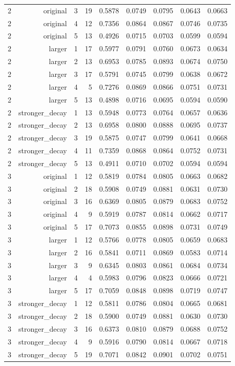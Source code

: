 \begin{longtable}{lrrrrrrrr}
2 & original & 3 & 19 & 0.5878 & 0.0749 & 0.0795 & 0.0643 & 0.0663 \\
2 & original & 4 & 12 & 0.7356 & 0.0864 & 0.0867 & 0.0746 & 0.0735 \\
2 & original & 5 & 13 & 0.4926 & 0.0715 & 0.0703 & 0.0599 & 0.0594 \\
2 & larger & 1 & 17 & 0.5977 & 0.0791 & 0.0760 & 0.0673 & 0.0634 \\
2 & larger & 2 & 13 & 0.6953 & 0.0785 & 0.0893 & 0.0674 & 0.0750 \\
2 & larger & 3 & 17 & 0.5791 & 0.0745 & 0.0799 & 0.0638 & 0.0672 \\
2 & larger & 4 & 5 & 0.7276 & 0.0869 & 0.0866 & 0.0751 & 0.0731 \\
2 & larger & 5 & 13 & 0.4898 & 0.0716 & 0.0695 & 0.0594 & 0.0590 \\
2 & stronger\_decay & 1 & 13 & 0.5948 & 0.0773 & 0.0764 & 0.0657 & 0.0636 \\
2 & stronger\_decay & 2 & 13 & 0.6958 & 0.0800 & 0.0888 & 0.0695 & 0.0737 \\
2 & stronger\_decay & 3 & 19 & 0.5875 & 0.0747 & 0.0799 & 0.0641 & 0.0668 \\
2 & stronger\_decay & 4 & 11 & 0.7359 & 0.0868 & 0.0864 & 0.0752 & 0.0731 \\
2 & stronger\_decay & 5 & 13 & 0.4911 & 0.0710 & 0.0702 & 0.0594 & 0.0594 \\
3 & original & 1 & 12 & 0.5819 & 0.0784 & 0.0805 & 0.0663 & 0.0682 \\
3 & original & 2 & 18 & 0.5908 & 0.0749 & 0.0881 & 0.0631 & 0.0730 \\
3 & original & 3 & 16 & 0.6369 & 0.0805 & 0.0879 & 0.0683 & 0.0752 \\
3 & original & 4 & 9 & 0.5919 & 0.0787 & 0.0814 & 0.0662 & 0.0717 \\
3 & original & 5 & 17 & 0.7073 & 0.0855 & 0.0898 & 0.0731 & 0.0749 \\
3 & larger & 1 & 12 & 0.5766 & 0.0778 & 0.0805 & 0.0659 & 0.0683 \\
3 & larger & 2 & 16 & 0.5841 & 0.0711 & 0.0869 & 0.0583 & 0.0714 \\
3 & larger & 3 & 9 & 0.6345 & 0.0803 & 0.0861 & 0.0684 & 0.0734 \\
3 & larger & 4 & 4 & 0.5983 & 0.0796 & 0.0823 & 0.0666 & 0.0721 \\
3 & larger & 5 & 17 & 0.7059 & 0.0848 & 0.0898 & 0.0719 & 0.0747 \\
3 & stronger\_decay & 1 & 12 & 0.5811 & 0.0786 & 0.0804 & 0.0665 & 0.0681 \\
3 & stronger\_decay & 2 & 18 & 0.5900 & 0.0749 & 0.0881 & 0.0630 & 0.0730 \\
3 & stronger\_decay & 3 & 16 & 0.6373 & 0.0810 & 0.0879 & 0.0688 & 0.0752 \\
3 & stronger\_decay & 4 & 9 & 0.5916 & 0.0790 & 0.0814 & 0.0667 & 0.0718 \\
3 & stronger\_decay & 5 & 19 & 0.7071 & 0.0842 & 0.0901 & 0.0702 & 0.0751 \\
\end{longtable}\endgroup
